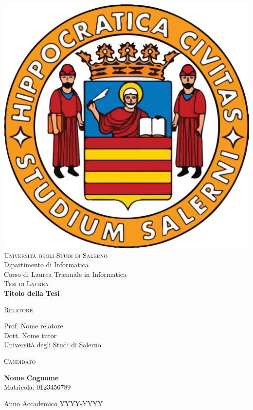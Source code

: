 \begin{titlepage}
\changepage{}{}{}{-7.5 mm}{}{}{}{}{}


\begin{center}
\vspace{0.5cm}
\includegraphics [width=.15\columnwidth, angle=0]{covermatter/figure/logo-unisa}\\ %
{\Large \scshape Università degli Studi di Salerno}\\
\vspace{0.5cm}
{\Large Dipartimento di Informatica}\\
\vspace{0.5cm}
{\Large Corso di Laurea Triennale in Informatica}\\
\vspace{1.5cm}
{\Large \scshape Tesi di Laurea} \\
\vspace{4cm}
{\Huge \bfseries Titolo della Tesi} \\
\vspace{4cm}

\begin{minipage}[t]{7cm}
\flushleft
{\large \textsc{Relatore}}

{\large Prof. Nome relatore} \\
{\large Dott. Nome tutor} \\
Università degli Studi di Salerno \\[0.25cm]
\end{minipage}
\hfill
\begin{minipage}[t]{7cm}
\flushright
{\large \textsc{Candidato}}

{\large \textbf{Nome Cognome}} \\
Matricola: 0123456789
\end{minipage}

\vspace{3cm}

{\small Anno Accademico YYYY-YYYY} %
%
%
\end{center}

\end{titlepage}
